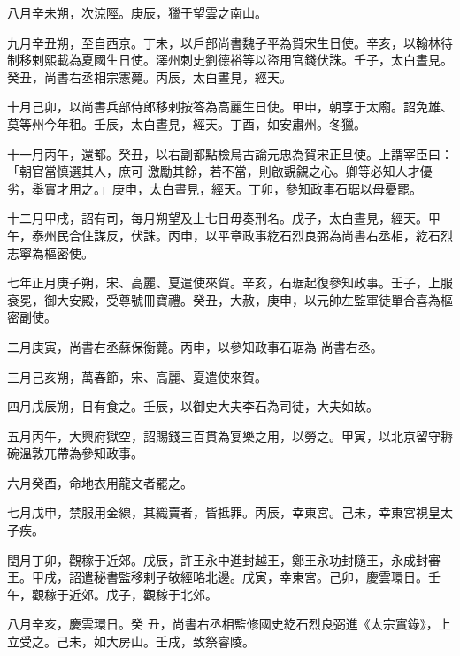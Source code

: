 \begin{pinyinscope}
 八月辛未朔，次涼陘。庚辰，獵于望雲之南山。



 九月辛丑朔，至自西京。丁未，以戶部尚書魏子平為賀宋生日使。辛亥，以翰林待制移剌熙載為夏國生日使。澤州刺史劉德裕等以盜用官錢伏誅。壬子，太白晝見。癸丑，尚書右丞相宗憲薨。丙辰，太白晝見，經天。



 十月己卯，以尚書兵部侍郎移剌按答為高麗生日使。甲申，朝享于太廟。詔免雄、莫等州今年租。壬辰，太白晝見，經天。丁酉，如安肅州。冬獵。



 十一月丙午，還都。癸丑，以右副都點檢烏古論元忠為賀宋正旦使。上謂宰臣曰：「朝官當慎選其人，庶可
 激勵其餘，若不當，則啟覬覦之心。卿等必知人才優劣，舉實才用之。」庚申，太白晝見，經天。丁卯，參知政事石琚以母憂罷。



 十二月甲戌，詔有司，每月朔望及上七日毋奏刑名。戊子，太白晝見，經天。甲午，泰州民合住謀反，伏誅。丙申，以平章政事紇石烈良弼為尚書右丞相，紇石烈志寧為樞密使。



 七年正月庚子朔，宋、高麗、夏遣使來賀。辛亥，石琚起復參知政事。壬子，上服袞冕，御大安殿，受尊號冊寶禮。癸丑，大赦，庚申，以元帥左監軍徒單合喜為樞密副使。



 二月庚寅，尚書右丞蘇保衡薨。丙申，以參知政事石琚為
 尚書右丞。



 三月己亥朔，萬春節，宋、高麗、夏遣使來賀。



 四月戊辰朔，日有食之。壬辰，以御史大夫李石為司徒，大夫如故。



 五月丙午，大興府獄空，詔賜錢三百貫為宴樂之用，以勞之。甲寅，以北京留守耨碗溫敦兀帶為參知政事。



 六月癸酉，命地衣用龍文者罷之。



 七月戊申，禁服用金線，其織賣者，皆抵罪。丙辰，幸東宮。己未，幸東宮視皇太子疾。



 閏月丁卯，觀稼于近郊。戊辰，許王永中進封越王，鄭王永功封隨王，永成封審王。甲戌，詔遣秘書監移剌子敬經略北邊。戊寅，幸東宮。己卯，慶雲環日。壬午，觀稼于近郊。戊子，觀稼于北郊。



 八月辛亥，慶雲環日。癸
 丑，尚書右丞相監修國史紇石烈良弼進《太宗實錄》，上立受之。己未，如大房山。壬戌，致祭睿陵。




\end{pinyinscope}
